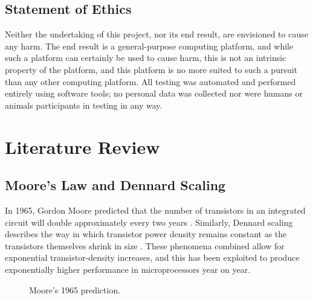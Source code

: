 \documentclass{UoYCSproject}
\begin{document}
\section{Statement of Ethics}

Neither the undertaking of this project, nor its end result, are envisioned to cause any harm. The end result is
a general-purpose computing platform, and while such a platform can certainly be used to cause harm, this is not an intrinsic
property of the platform, and this platform is no more suited to such a pursuit than any other computing platform.
All testing was automated and performed entirely using software tools; no personal data was collected nor were humans
or animals participants in testing in any way.

\chapter{Literature Review}

\section{Moore's Law and Dennard Scaling}

In 1965, Gordon Moore predicted that the number of transistors in an integrated circuit will double
approximately every two years  \cite{moore}. Similarly, Dennard scaling describes the way in which transistor power density
remains constant as the transistors themselves shrink in size \cite{dennard}. These phenomena combined allow for exponential
transistor-density increases, and this has been exploited to produce exponentially higher performance in
microprocessors year on year.

\begin{figure}[h]
\caption{Moore's 1965 prediction. \cite{moore}}
\end{figure}
\end{document}
